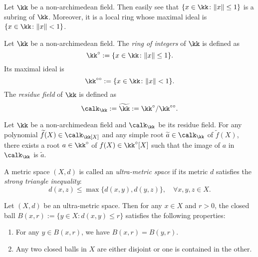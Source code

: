     Let \(\kk\) be a non-archimedean field.
    Then easily see that \(\{x \in \kk\colon \|x\|\leq 1\}\) is a subring of \(\kk\).
    Moreover, it is a local ring whose maximal ideal is \(\{x \in \kk\colon \|x\| < 1\}\).

    \begin{definition}\label{def:non-archimedean_field_ring_of_integers_maximal_ideal_and_residue_field}
        Let \(\kk\) be a non-archimedean field.
        The \emph{ring of integers} of \(\kk\) is defined as
        \[ \kk^\circ := \{x \in \kk\colon \|x\|\leq 1\}. \]
        Its maximal ideal is
        \[ \kk^{\circ\circ} := \{x \in \kk\colon \|x\| < 1\}. \]
        The \emph{residue field} of \(\kk\) is defined as
        \[ \calk_\kk := \widetilde{\kk} := \kk^\circ / \kk^{\circ\circ}. \]
    \end{definition}


    \begin{theorem}\label{thm:Hessel_lemma}
        Let \(\kk\) be a non-archimedean field and \(\calk_\kk\) be its residue field.
        For any polynomial \(\widetilde{f}(X) \in \calk_\kk[X]\) and any simple root \(\widetilde{a} \in \calk_\kk\) of \(\widetilde{f}(X)\), there exists a root \(a \in \kk^\circ\) of \(f(X) \in \kk^\circ[X]\) such that the image of \(a\) in \(\calk_\kk\) is \(\widetilde{a}\).
    \end{theorem}

    \begin{definition}\label{def:ultra-metric_space}
        A metric space \((X,d)\) is called an \emph{ultra-metric space} if its metric \(d\) satisfies the \emph{strong triangle inequality}:
        \[ d(x,z) \leq \max\{d(x,y), d(y,z)\},\quad\forall x,y,z\in X. \]
    \end{definition}

    \begin{proposition}\label{prop:balls_in_ultra-metric_space}
        Let \((X,d)\) be an ultra-metric space.
        Then for any \(x \in X\) and \(r > 0\), the closed ball \(B(x,r) := \{y \in X\colon d(x,y) \leq r\}\) satisfies the following properties:
        \begin{enumerate}
            \item For any \(y \in B(x,r)\), we have \(B(x,r) = B(y,r)\).
            \item Any two closed balls in \(X\) are either disjoint or one is contained in the other.
        \end{enumerate}
    \end{proposition}

